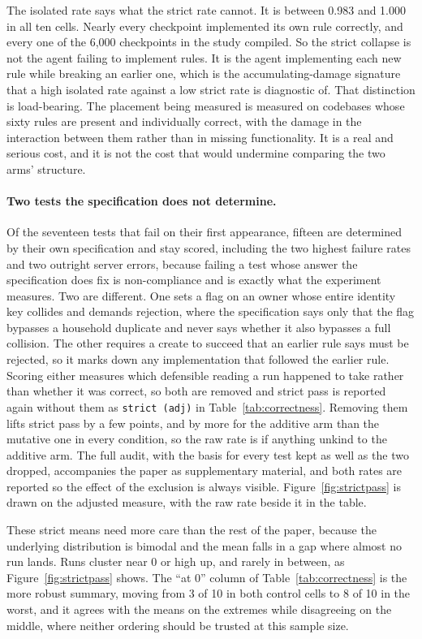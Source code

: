 \documentclass[11pt,a4paper]{article}
\begin{document}
The isolated rate says what the strict rate cannot. It is between 0.983 and
1.000 in all ten cells. Nearly every checkpoint implemented its own rule
correctly, and every one of the 6{,}000 checkpoints in the study compiled. So the
strict collapse is not the agent failing to implement rules. It is the agent
implementing each new rule while breaking an earlier one, which is the
accumulating-damage signature that a high isolated rate against a low strict rate
is diagnostic of. That distinction is load-bearing. The placement being measured
is measured on codebases whose sixty rules are present and individually correct,
with the damage in the interaction between them rather than in missing
functionality. It is a real and serious cost, and it is not the cost that would
undermine comparing the two arms' structure.

\paragraph{Two tests the specification does not determine.} Of the seventeen tests
that fail on their first appearance, fifteen are determined by their own
specification and stay scored, including the two highest failure rates and two
outright server errors, because failing a test whose answer the specification does
fix is non-compliance and is exactly what the experiment measures. Two are
different. One sets a flag on an owner whose entire identity key collides and
demands rejection, where the specification says only that the flag bypasses a
household duplicate and never says whether it also bypasses a full collision. The
other requires a create to succeed that an earlier rule says must be rejected, so
it marks down any implementation that followed the earlier rule. Scoring either
measures which defensible reading a run happened to take rather than whether it was
correct, so both are removed and strict pass is reported again without them as
\texttt{strict (adj)} in Table~\ref{tab:correctness}. Removing them lifts strict
pass by a few points, and by more for the additive arm than the mutative one in
every condition, so the raw rate is if anything unkind to the additive arm. The
full audit, with the basis for every test kept as well as the two dropped,
accompanies the paper as supplementary material, and both rates are reported
so the effect of the exclusion is always visible. Figure~\ref{fig:strictpass} is
drawn on the adjusted measure, with the raw rate beside it in the table.

These strict means need more care than the rest of the paper, because the
underlying distribution is bimodal and the mean falls in a gap where almost no
run lands. Runs cluster near 0 or high up, and rarely in between, as
Figure~\ref{fig:strictpass} shows. The ``at 0'' column of
Table~\ref{tab:correctness} is the more robust summary, moving from 3 of 10 in
both control cells to 8 of 10 in the worst, and it agrees with the means on the
extremes while disagreeing on the middle, where neither ordering should be
trusted at this sample size.
\end{document}
